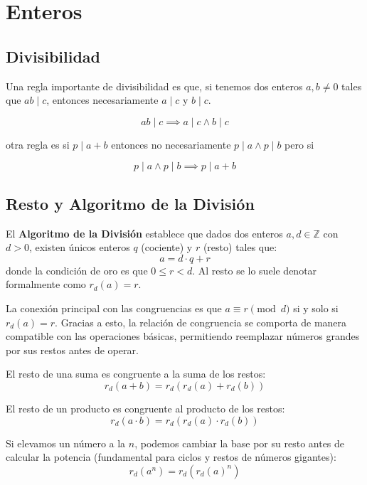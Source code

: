 \chapter{Enteros}


\section{Divisibilidad }

\begin{teoria}[title=Propiedad div que el divisor es multiplicacion]
Una regla importante de divisibilidad es que, si tenemos
dos enteros $a,b \neq 0$ tales que $ab \mid c$, entonces
necesariamente $a \mid c$ y $b \mid c$.

\[
ab \mid c \implies a \mid c \land b \mid c
\]
\end{teoria}

\begin{teoria}[title=Propiedad division de suma de terminos ]
otra regla es si $p \mid a+b$ entonces no necesariamente $p \mid a \land p \mid b$
pero si 

\[
 p \mid a \land p \mid b \implies p \mid a+b 
\]
\end{teoria}

\section{Resto y Algoritmo de la División}

\begin{definicion}
    El \textbf{Algoritmo de la División} establece que dados dos enteros $a, d \in \mathbb{Z}$ con $d > 0$, existen únicos enteros $q$ (cociente) y $r$ (resto) tales que:
    \[ a = d \cdot q + r \]
    donde la condición de oro es que $0 \le r < d$. Al resto se lo suele denotar formalmente como $r_d(a) = r$.
\end{definicion}

\begin{teoria}[title=Propiedades aritméticas del Resto]
La conexión principal con las congruencias es que $a \equiv r \pmod{d}$ si y solo si $r_d(a) = r$. Gracias a esto, la relación de congruencia se comporta de manera compatible con las operaciones básicas, permitiendo reemplazar números grandes por sus restos antes de operar.
\begin{listapropiedades}
  \item[Suma] El resto de una suma es congruente a la suma de los restos: 
  \[ r_d(a + b) = r_d(r_d(a) + r_d(b)) \]
  \item[Producto] El resto de un producto es congruente al producto de los restos: 
  \[ r_d(a \cdot b) = r_d(r_d(a) \cdot r_d(b)) \]
  \item[Potencias] Si elevamos un número a la $n$, podemos cambiar la base por su resto antes de calcular la potencia (fundamental para ciclos y restos de números gigantes): 
  \[ r_d(a^n) = r_d(r_d(a)^n) \]
\end{listapropiedades}
\end{teoria}

